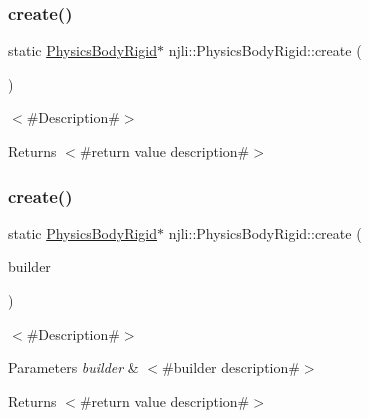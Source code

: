 \subsubsection{\texorpdfstring{create()}{create()}\hspace{0.1cm}{\footnotesize\ttfamily [1/2]}}
{\footnotesize\ttfamily static \mbox{\hyperlink{classnjli_1_1_physics_body_rigid}{Physics\+Body\+Rigid}}$\ast$ njli\+::\+Physics\+Body\+Rigid\+::create (\begin{DoxyParamCaption}{ }\end{DoxyParamCaption})\hspace{0.3cm}{\ttfamily [static]}}

$<$\#\+Description\#$>$

\begin{DoxyReturn}{Returns}
$<$\#return value description\#$>$ 
\end{DoxyReturn}
\mbox{\label{classnjli_1_1_physics_body_rigid_a701d02af43bfc3c058252d907b7a091c}} 
\subsubsection{\texorpdfstring{create()}{create()}\hspace{0.1cm}{\footnotesize\ttfamily [2/2]}}
{\footnotesize\ttfamily static \mbox{\hyperlink{classnjli_1_1_physics_body_rigid}{Physics\+Body\+Rigid}}$\ast$ njli\+::\+Physics\+Body\+Rigid\+::create (\begin{DoxyParamCaption}\item[{const \mbox{\hyperlink{classnjli_1_1_physics_body_rigid_builder}{Physics\+Body\+Rigid\+Builder}} \&}]{builder }\end{DoxyParamCaption})\hspace{0.3cm}{\ttfamily [static]}}

$<$\#\+Description\#$>$


\begin{DoxyParams}{Parameters}
{\em builder} & $<$\#builder description\#$>$\\
\hline
\end{DoxyParams}
\begin{DoxyReturn}{Returns}
$<$\#return value description\#$>$ 
\end{DoxyReturn}
\mbox{\label{classnjli_1_1_physics_body_rigid_a26ae91f4189d4e858907035bbd485967}} 
